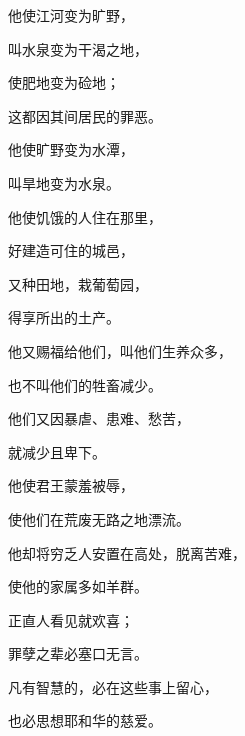 {\par }{\BB \par }{\Q {}他使江河变为旷野，
\par }{\Q 叫水泉变为干渴之地，
\par }{\Q {}使肥地变为硷地；
\par }{\Q 这都因其间居民的罪恶。
\par }{\Q {}他使旷野变为水潭，
\par }{\Q 叫旱地变为水泉。
\par }{\Q {}他使饥饿的人住在那里，
\par }{\Q 好建造可住的城邑，
\par }{\Q {}又种田地，栽葡萄园，
\par }{\Q 得享所出的土产。
\par }{\Q {}他又赐福给他们，叫他们生养众多，
\par }{\Q 也不叫他们的牲畜减少。
\par }{\BB \par }{\Q {}他们又因暴虐、患难、愁苦，
\par }{\Q 就减少且卑下。
\par }{\Q {}他使君王蒙羞被辱，
\par }{\Q 使他们在荒废无路之地漂流。
\par }{\Q {}他却将穷乏人安置在高处，脱离苦难，
\par }{\Q 使他的家属多如羊群。
\par }{\Q {}正直人看见就欢喜；
\par }{\Q 罪孽之辈必塞口无言。
\par }{\Q {}凡有智慧的，必在这些事上留心，
\par }{\Q 也必思想耶和华的慈爱。

}

